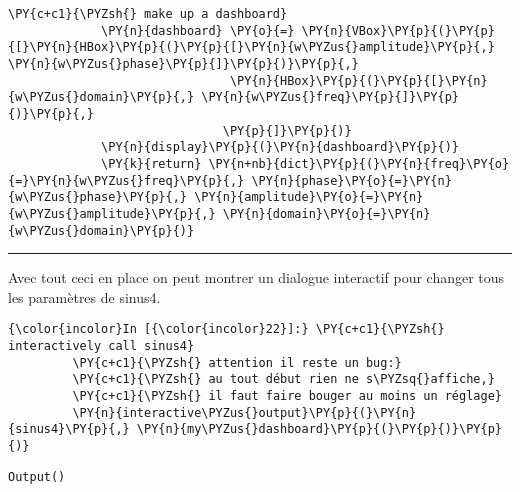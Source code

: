 \begin{Verbatim}[commandchars=\\\{\}]
             \PY{c+c1}{\PYZsh{} make up a dashboard}
             \PY{n}{dashboard} \PY{o}{=} \PY{n}{VBox}\PY{p}{(}\PY{p}{[}\PY{n}{HBox}\PY{p}{(}\PY{p}{[}\PY{n}{w\PYZus{}amplitude}\PY{p}{,} \PY{n}{w\PYZus{}phase}\PY{p}{]}\PY{p}{)}\PY{p}{,}
                               \PY{n}{HBox}\PY{p}{(}\PY{p}{[}\PY{n}{w\PYZus{}domain}\PY{p}{,} \PY{n}{w\PYZus{}freq}\PY{p}{]}\PY{p}{)}\PY{p}{,}
                              \PY{p}{]}\PY{p}{)}
             \PY{n}{display}\PY{p}{(}\PY{n}{dashboard}\PY{p}{)}
             \PY{k}{return} \PY{n+nb}{dict}\PY{p}{(}\PY{n}{freq}\PY{o}{=}\PY{n}{w\PYZus{}freq}\PY{p}{,} \PY{n}{phase}\PY{o}{=}\PY{n}{w\PYZus{}phase}\PY{p}{,} \PY{n}{amplitude}\PY{o}{=}\PY{n}{w\PYZus{}amplitude}\PY{p}{,} \PY{n}{domain}\PY{o}{=}\PY{n}{w\PYZus{}domain}\PY{p}{)}
\end{Verbatim}


    \begin{center}\rule{0.5\linewidth}{\linethickness}\end{center}

Avec tout ceci en place on peut montrer un dialogue interactif pour
changer tous les paramètres de sinus4.

    \begin{Verbatim}[commandchars=\\\{\}]
{\color{incolor}In [{\color{incolor}22}]:} \PY{c+c1}{\PYZsh{} interactively call sinus4}
         \PY{c+c1}{\PYZsh{} attention il reste un bug:}
         \PY{c+c1}{\PYZsh{} au tout début rien ne s\PYZsq{}affiche,}
         \PY{c+c1}{\PYZsh{} il faut faire bouger au moins un réglage}
         \PY{n}{interactive\PYZus{}output}\PY{p}{(}\PY{n}{sinus4}\PY{p}{,} \PY{n}{my\PYZus{}dashboard}\PY{p}{(}\PY{p}{)}\PY{p}{)}
\end{Verbatim}


    
    
    
    \begin{verbatim}
Output()
    \end{verbatim}

    

    
    
    

